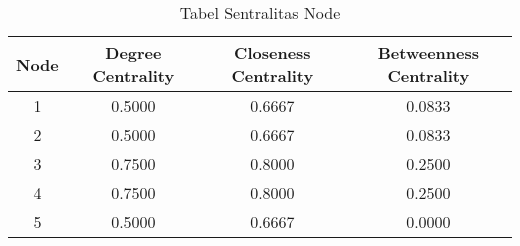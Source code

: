 \begin{table}[h]
\centering
\begin{tabular}{c c c c}
\hline
Node & Degree Centrality & Closeness Centrality & Betweenness Centrality \\
\hline
1 & 0.5000 & 0.6667 & 0.0833 \\
2 & 0.5000 & 0.6667 & 0.0833 \\
3 & 0.7500 & 0.8000 & 0.2500 \\
4 & 0.7500 & 0.8000 & 0.2500 \\
5 & 0.5000 & 0.6667 & 0.0000 \\
\hline
\end{tabular}
\caption{Tabel Sentralitas Node}
\end{table}
